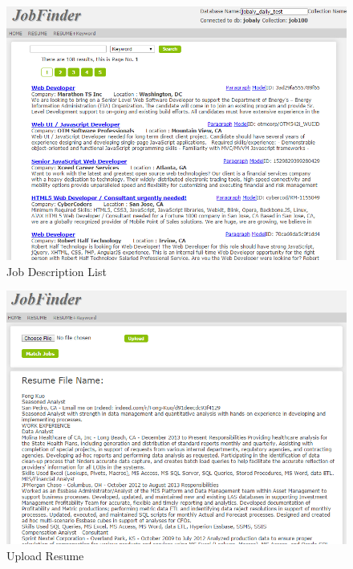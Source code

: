 \begin{figure}[htbp]
  \centering
  \includegraphics[scale=0.5]{images/joblist.png}
  \caption{Job Description List}
  \label{fig:joblist}
\end{figure}


\begin{figure}[htbp]
  \centering
  \includegraphics[scale=0.5]{images/upload_resume.png}
  \caption{Upload Resume}
  \label{fig:upload_resume}
\end{figure}

